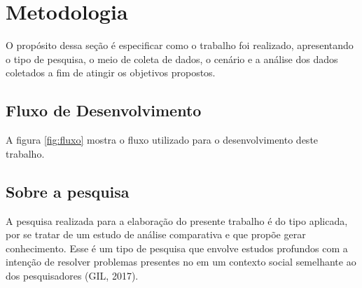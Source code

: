 \chapter{Metodologia}
\label{chap:metodologia}

O propósito dessa seção é especificar como o trabalho foi realizado, apresentando o tipo de pesquisa, o meio de coleta de dados, o cenário e a análise dos dados coletados a fim de atingir os objetivos propostos.

\section{Fluxo de Desenvolvimento}
\label{sec:fluxo-de-desewnvolvimento}

A figura \ref{fig:fluxo} mostra o fluxo utilizado para o desenvolvimento deste trabalho.

\begin{figure}[h!]
	\centering
\end{figure}

\section{Sobre a pesquisa}
\label{sec:sobre-a-pesquisa}

A pesquisa realizada para a elaboração do presente trabalho é do tipo aplicada, por se tratar de um estudo de análise comparativa e que propõe gerar conhecimento. Esse é um tipo de pesquisa que envolve estudos profundos com a intenção de resolver problemas presentes no em um contexto social semelhante ao dos pesquisadores (GIL, 2017)\nocite{pesquisa}.

